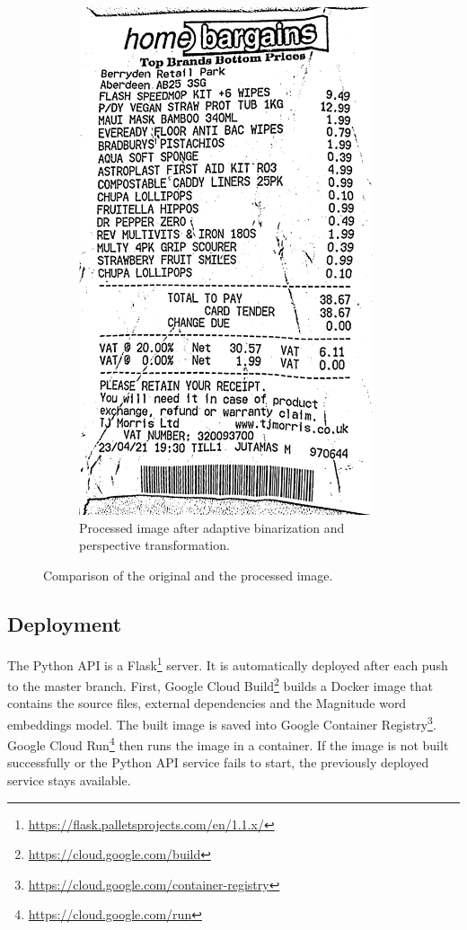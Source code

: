 \documentclass[
  digital, %
  table,   %
  oneside, %
  lof,     %
  lot,     %
]{fithesis3}
\begin{document}
\begin{figure}[H]
\begin{subfigure}[t]{0.37\textwidth}
          \includegraphics[width=0.95\textwidth]{figures/image_processing/processed_image}
          \caption{Processed image after adaptive binarization and perspective transformation.}
        \end{subfigure}
        \caption{Comparison of the original and the processed image.}
        \label{fig:original_vs_processed}
    \end{figure}

\subsection{Deployment}
The Python API is a Flask\footnote{\url{https://flask.palletsprojects.com/en/1.1.x/}} server. 
It is automatically deployed after each push to the master branch.
First, Google Cloud Build\footnote{\url{https://cloud.google.com/build}} builds a Docker image that contains the source files, external dependencies and the Magnitude word embeddings model. The built image is saved into Google Container Registry\footnote{\url{https://cloud.google.com/container-registry}}. Google Cloud Run\footnote{\url{https://cloud.google.com/run}} then runs the image in a container.
If the image is not built successfully or the Python API service fails to start, the previously deployed service stays available.
\end{document}
